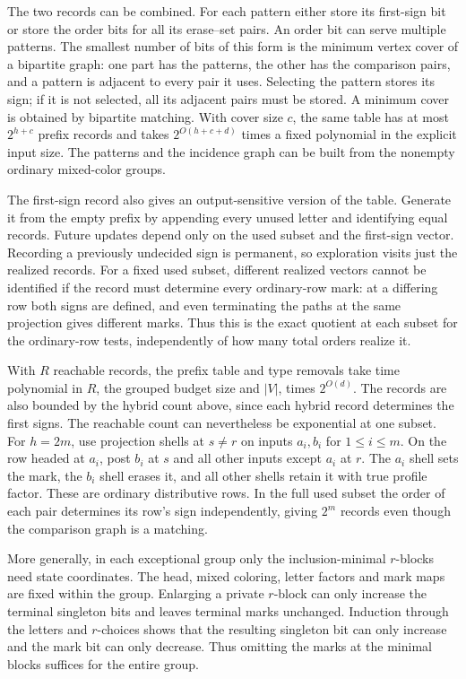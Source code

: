 The two records can be combined. For each pattern
either store its first-sign bit or store the order
bits for all its erase--set pairs. An order bit
can serve multiple patterns. The smallest number
of bits of this form is the minimum vertex cover
of a bipartite graph: one part has the patterns,
the other has the comparison pairs, and a pattern
is adjacent to every pair it uses. Selecting the
pattern stores its sign; if it is not selected,
all its adjacent pairs must be stored. A minimum
cover is obtained by bipartite matching. With cover
size $c$, the same table has at most $2^{h+c}$
prefix records and takes $2^{O(h+c+d)}$ times a
fixed polynomial in the explicit input size. The
patterns and the incidence graph can be built
from the nonempty ordinary mixed-color groups.

The first-sign record also gives an output-sensitive
version of the table. Generate it from the empty
prefix by appending every unused letter and identifying
equal records. Future updates depend only on the
used subset and the first-sign vector. Recording a
previously undecided sign is permanent, so exploration
visits just the realized records. For a fixed used
subset, different realized vectors cannot be identified
if the record must determine every ordinary-row mark:
at a differing row both signs are defined, and even
terminating the paths at the same projection gives
different marks. Thus this is the exact quotient at
each subset for the ordinary-row tests, independently
of how many total orders realize it.

With $R$ reachable records, the prefix table and type
removals take time polynomial in $R$, the grouped
budget size and $|V|$, times $2^{O(d)}$. The records
are also bounded by the hybrid count above, since
each hybrid record determines the first signs. The
reachable count can nevertheless be exponential at
one subset. For $h=2m$, use projection shells at
$s\ne r$ on inputs $a_i,b_i$ for $1\le i\le m$.
On the row headed at $a_i$, post $b_i$ at $s$ and
all other inputs except $a_i$ at $r$. The $a_i$
shell sets the mark, the $b_i$ shell erases it, and
all other shells retain it with true profile factor.
These are ordinary distributive rows. In the full
used subset the order of each pair determines its
row's sign independently, giving $2^m$ records
even though the comparison graph is a matching.

More generally, in each exceptional group only the
inclusion-minimal $r$-blocks need state coordinates.
The head, mixed coloring, letter factors and mark
maps are fixed within the group. Enlarging a private
$r$-block can only increase the terminal singleton
bits and leaves terminal marks unchanged. Induction
through the letters and $r$-choices shows that the
resulting singleton bit can only increase and the
mark bit can only decrease. Thus omitting the marks
at the minimal blocks suffices for the entire group.

